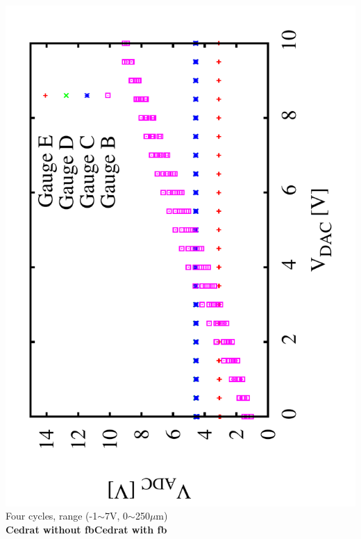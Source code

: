 \documentclass[a4paper,11pt]{book}
\begin{document}
 \includegraphics[angle=-90,scale=0.15]{image_ai_04.pdf}\\
{\tiny Four cycles, range (-1$\sim$7V, 0$\sim$250$\mu$m)}\\
\textbf{Cedrat without fb}\hspace*{3.2cm}\textbf{Cedrat with  fb}\par
\end{document}
